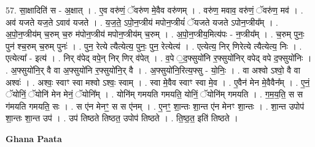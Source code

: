 \documentclass[17pt]{extarticle}
\begin{document}
57. सा॒क्षादिति॑ स - अ॒क्षात् । . ए॒व वरु॑णं॒ ॅवरु॑ण मे॒वैव वरु॑णम् । . वरु॑ण॒ मवाव॒ वरु॑णं॒ ॅवरु॑ण॒ मव॑ । . अव॑ यजते यज॒ते ऽवाव॑ यजते । . य॒ज॒ते॒ ऽपो॒न॒प्त्रीय॑ मपोन॒प्त्रीयं॑ ॅयजते यजते ऽपोन॒प्त्रीय᳚म् । . अ॒पो॒न॒प्त्रीय॑म् च॒रुम् च॒रु म॑पोन॒प्त्रीय॑ मपोन॒प्त्रीय॑म् च॒रुम् । . अ॒पो॒न॒प्त्रीय॒मित्य॑पः - न॒प्त्रीय᳚म् । . च॒रुम् पुनः॒ पुन॑ श्च॒रुम् च॒रुम् पुनः॑ । . पुन॒ रेत्ये त्यैत्येत्य॒ पुनः॒ पुन॒ रेत्येत्य॑ । . एत्येत्य॒ निर् णिरेत्ये त्यैत्येत्य॒ निः । . एत्येत्या᳚ - इत्य॑ । . निर् व॑पेद् वपे॒न् निर् णिर् व॑पेत् । . व॒पे ॒द॒फ्सुयो॑नि र॒फ्सुयो॑निर् वपेद् वपे द॒फ्सुयो॑निः । . अ॒फ्सुयो॑नि॒र् वै वा अ॒फ्सुयो॑नि र॒फ्सुयो॑नि॒र् वै । . अ॒फ्सुयो॑नि॒रित्य॒फ्सु - यो॒निः॒ । . वा अश्वो ऽश्वो॒ वै वा अश्वः॑ । . अश्वः॒ स्वाꣳ स्वा मश्वो ऽश्वः॒ स्वाम् । . स्वा मे॒वैव स्वाꣳ स्वा मे॒व । . ए॒वैन॑ मेन मे॒वैवैन᳚म् । . ए॒नं॒ ॅयोनिं॒ ॅयोनि॑ मेन मेनं॒ ॅयोनि᳚म् । . योनि॑म् गमयति गमयति॒ योनिं॒ ॅयोनि॑म् गमयति । . ग॒म॒य॒ति॒ स स ग॑मयति गमयति॒ सः । . स ए॑न मेनꣳ॒॒ स स ए॑नम् । . ए॒नꣳ॒॒ शा॒न्तः शा॒न्त ए॑न मेनꣳ शा॒न्तः । . शा॒न्त उपोप॑ शा॒न्तः शा॒न्त उप॑ । . उप॑ तिष्ठते तिष्ठत॒ उपोप॑ तिष्ठते । . ति॒ष्ठ॒त॒ इति॑ तिष्ठते । \newline

\textbf{Ghana Paata } \newline
\end{document}
